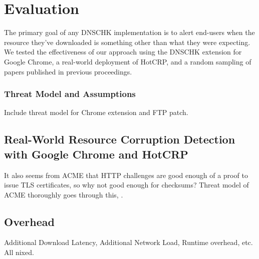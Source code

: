 \section{Evaluation} \label{sec:evaluation}

The primary goal of any DNSCHK implementation is to alert end-users when the
resource they've downloaded is something other than what they were expecting. We
tested the effectiveness of our approach using the DNSCHK extension for Google
Chrome, a real-world deployment of HotCRP, and a random sampling of papers
published in previous \CONFERENCE{} proceedings.

\subsubsection{Threat Model and Assumptions}

Include threat model for Chrome extension and FTP patch.

\subsection{Real-World Resource Corruption Detection with Google Chrome and HotCRP}

It also seems from ACME that HTTP challenges are good enough of a proof to issue
TLS certificates, so why not good enough for checksums? Threat model of ACME
thoroughly goes through this, \cite{draft-ACME}.

\subsection{Overhead}

Additional Download Latency, Additional Network Load, Runtime overhead, etc. All
nixed.
